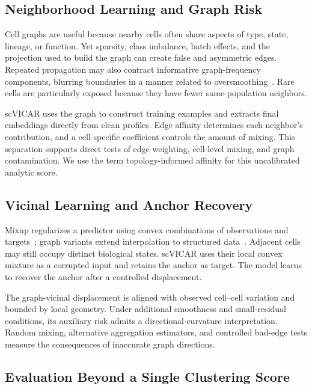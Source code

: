 \subsection{Neighborhood Learning and Graph Risk}

Cell graphs are useful because nearby cells often share aspects of type, state,
lineage, or function.  Yet sparsity, class imbalance, batch effects, and the
projection used to build the graph can create false and asymmetric edges.
Repeated propagation may also contract informative graph-frequency components,
blurring boundaries in a manner related to oversmoothing~\cite{li2018laplacian}.
Rare cells are particularly exposed because they have fewer same-population
neighbors.

scVICAR uses the graph to construct training examples and extracts final
embeddings directly from clean profiles. Edge affinity determines each
neighbor's contribution, and a cell-specific coefficient controls the amount
of mixing. This separation supports direct tests of edge weighting, cell-level
mixing, and graph contamination. We use the term topology-informed affinity
for this uncalibrated analytic score.

\subsection{Vicinal Learning and Anchor Recovery}

Mixup regularizes a predictor using convex combinations of observations and
targets~\cite{zhang2018mixup}; graph variants extend interpolation to structured
data~\cite{wang2021graphmixup}. Adjacent cells may still occupy distinct
biological states. scVICAR uses their local convex mixture as a corrupted input
and retains the anchor as target. The model learns to recover the anchor after
a controlled displacement.

The graph-vicinal displacement is aligned with observed cell--cell variation
and bounded by local geometry.  Under additional smoothness and small-residual
conditions, its auxiliary risk admits a directional-curvature interpretation.
Random mixing, alternative aggregation estimators, and controlled bad-edge
tests measure the consequences of inaccurate graph directions.

\subsection{Evaluation Beyond a Single Clustering Score}

